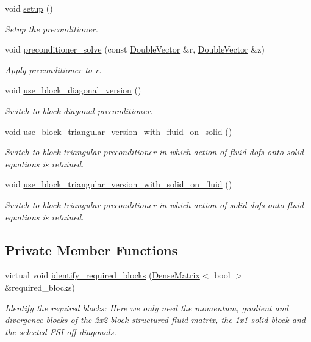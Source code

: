 \begin{DoxyCompactItemize}
void \hyperlink{classoomph_1_1SimpleFSIPreconditioner_aaf19c0c3f19f6d8ef4f36a1581829230}{setup} ()
\begin{DoxyCompactList}\small\item\em Setup the preconditioner. \end{DoxyCompactList}\item 
void \hyperlink{classoomph_1_1SimpleFSIPreconditioner_a31684c26aa10a782189c32304d9d0824}{preconditioner\+\_\+solve} (const \hyperlink{classoomph_1_1DoubleVector}{Double\+Vector} \&r, \hyperlink{classoomph_1_1DoubleVector}{Double\+Vector} \&z)
\begin{DoxyCompactList}\small\item\em Apply preconditioner to r. \end{DoxyCompactList}\item 
void \hyperlink{classoomph_1_1SimpleFSIPreconditioner_a9e4313b890f586d4e1fb406a1b9d3948}{use\+\_\+block\+\_\+diagonal\+\_\+version} ()
\begin{DoxyCompactList}\small\item\em Switch to block-\/diagonal preconditioner. \end{DoxyCompactList}\item 
void \hyperlink{classoomph_1_1SimpleFSIPreconditioner_ae996d56f6e94d88967e8aad4e664ee74}{use\+\_\+block\+\_\+triangular\+\_\+version\+\_\+with\+\_\+fluid\+\_\+on\+\_\+solid} ()
\begin{DoxyCompactList}\small\item\em Switch to block-\/triangular preconditioner in which action of fluid dofs onto solid equations is retained. \end{DoxyCompactList}\item 
void \hyperlink{classoomph_1_1SimpleFSIPreconditioner_a888de44acd9583fe7cce949a461dfc56}{use\+\_\+block\+\_\+triangular\+\_\+version\+\_\+with\+\_\+solid\+\_\+on\+\_\+fluid} ()
\begin{DoxyCompactList}\small\item\em Switch to block-\/triangular preconditioner in which action of solid dofs onto fluid equations is retained. \end{DoxyCompactList}\end{DoxyCompactItemize}
\subsection*{Private Member Functions}
\begin{DoxyCompactItemize}
\item 
virtual void \hyperlink{classoomph_1_1SimpleFSIPreconditioner_abaf505c05ec128f4c3c6ff5036fb3db1}{identify\+\_\+required\+\_\+blocks} (\hyperlink{classoomph_1_1DenseMatrix}{Dense\+Matrix}$<$ bool $>$ \&required\+\_\+blocks)
\begin{DoxyCompactList}\small\item\em Identify the required blocks\+: Here we only need the momentum, gradient and divergence blocks of the 2x2 block-\/structured fluid matrix, the 1x1 solid block and the selected F\+S\+I-\/off diagonals. \end{DoxyCompactList}\end{DoxyCompactItemize}
